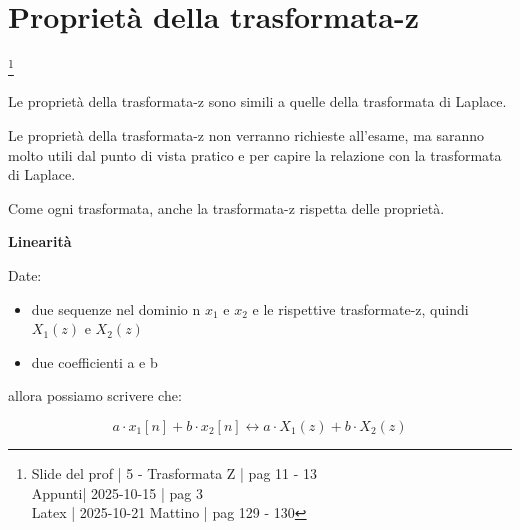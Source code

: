 \newpage 

\section{Proprietà della trasformata-z} \label{sec: Proprietà della trasformata-z}

\footnote{ 
    Slide del prof | 5 - Trasformata Z | pag 11 - 13\\
    Appunti| 2025-10-15 | pag 3 \\ 
    Latex | 2025-10-21 Mattino | pag 129 - 130
} 

\begin{tcolorbox}
    Le proprietà della trasformata-z sono simili a quelle della trasformata di Laplace. \newline 

    Le proprietà della trasformata-z non verranno richieste all'esame, ma saranno molto utili dal punto di vista pratico e per capire la relazione con la trasformata di Laplace.
\end{tcolorbox}

Come ogni trasformata, anche la trasformata-z rispetta delle proprietà. \newline 

\textbf{Linearità} \newline 

Date: 

\begin{itemize}
    \item due sequenze nel dominio n $x_1$ e $x_2$ e le rispettive trasformate-z, quindi $X_1 \left(z\right)$ e $X_2 \left(z\right)$ 
    \item due coefficienti a e b 
\end{itemize}

allora possiamo scrivere che: 

{
    \Large 
    \begin{equation}
        a \cdot x_1 \left[ n\right]
        + 
        b \cdot x_2 \left[ n\right]
        \leftrightarrow 
        a \cdot X_1 \left( z\right)
        + 
        b \cdot X_2 \left( z\right)
    \end{equation}
}

